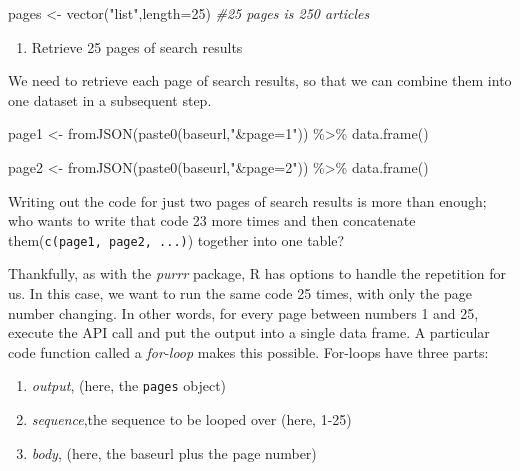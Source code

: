 \documentclass[
  krantz2]{krantz}
\makeatletter
\newenvironment{Shaded}{\begin{snugshade}}{\end{snugshade}}
\newcommand{\AttributeTok}[1]{\textcolor[rgb]{0.61,0.61,0.61}{#1}}
\newcommand{\CommentTok}[1]{\textcolor[rgb]{0.37,0.37,0.37}{\textit{#1}}}
\newcommand{\DecValTok}[1]{\textcolor[rgb]{0.06,0.06,0.06}{#1}}
\newcommand{\FunctionTok}[1]{\textcolor[rgb]{0,0,0}{#1}}
\newcommand{\NormalTok}[1]{#1}
\newcommand{\OtherTok}[1]{\textcolor[rgb]{0.37,0.37,0.37}{#1}}
\newcommand{\SpecialCharTok}[1]{\textcolor[rgb]{0,0,0}{#1}}
\newcommand{\StringTok}[1]{\textcolor[rgb]{0.5,0.5,0.5}{#1}}
\providecommand{\tightlist}{%
  \setlength{\itemsep}{0pt}\setlength{\parskip}{0pt}}
\newenvironment{kframe}{%
\medskip{}
\setlength{\fboxsep}{.8em}
 \def\at@end@of@kframe{}%
 \ifinner\ifhmode%
  \def\at@end@of@kframe{\end{minipage}}%
  \begin{minipage}{\columnwidth}%
 \fi\fi%
 \def\FrameCommand##1{\hskip\@totalleftmargin \hskip-\fboxsep
 \colorbox{shadecolor}{##1}\hskip-\fboxsep
     \hskip-\linewidth \hskip-\@totalleftmargin \hskip\columnwidth}%
 \MakeFramed {\advance\hsize-\width
   \@totalleftmargin\z@ \linewidth\hsize
   \@setminipage}}%
 {\par\unskip\endMakeFramed%
 \at@end@of@kframe}
\renewenvironment{Shaded}{\begin{kframe}}{\end{kframe}}
\makeatother
\begin{document}
\begin{Shaded}
\begin{Highlighting}[]
\NormalTok{pages }\OtherTok{\textless{}{-}} \FunctionTok{vector}\NormalTok{(}\StringTok{"list"}\NormalTok{,}\AttributeTok{length=}\DecValTok{25}\NormalTok{) }\CommentTok{\#25 pages is 250 articles}
\end{Highlighting}
\end{Shaded}

\begin{enumerate}
\def\labelenumi{\arabic{enumi}.}
\setcounter{enumi}{2}
\tightlist
\item
  Retrieve 25 pages of search results
\end{enumerate}

We need to retrieve each page of search results, so that we can combine them into one dataset in a subsequent step.

\begin{Shaded}
\begin{Highlighting}[]
\NormalTok{page1 }\OtherTok{\textless{}{-}} \FunctionTok{fromJSON}\NormalTok{(}\FunctionTok{paste0}\NormalTok{(baseurl,}\StringTok{"\&page=1"}\NormalTok{)) }\SpecialCharTok{\%\textgreater{}\%}
    \FunctionTok{data.frame}\NormalTok{()}

\NormalTok{page2 }\OtherTok{\textless{}{-}} \FunctionTok{fromJSON}\NormalTok{(}\FunctionTok{paste0}\NormalTok{(baseurl,}\StringTok{"\&page=2"}\NormalTok{)) }\SpecialCharTok{\%\textgreater{}\%}
    \FunctionTok{data.frame}\NormalTok{()}
\end{Highlighting}
\end{Shaded}

Writing out the code for just two pages of search results is more than enough; who wants to write that code 23 more times and then concatenate them(\texttt{c(page1,\ page2,\ ...)}) together into one table?

Thankfully, as with the \emph{purrr} package, R has options to handle the repetition for us. In this case, we want to run the same code 25 times, with only the page number changing. In other words, for every page between numbers 1 and 25, execute the API call and put the output into a single data frame. A particular code function called a \emph{for-loop} makes this possible. For-loops have three parts\citep{wickham2016}:

\begin{enumerate}
\def\labelenumi{\arabic{enumi}.}
\tightlist
\item
  \emph{output}, (here, the \texttt{pages} object)
\item
  \emph{sequence},the sequence to be looped over (here, 1-25)
\item
  \emph{body}, (here, the baseurl plus the page number)
\end{enumerate}
\end{document}
